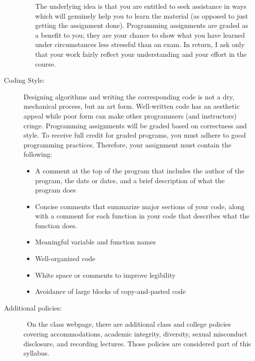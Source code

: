 \documentclass [letterpaper,11pt]{article}
\begin{document}
\begin{description}
\begin{itemize}
\begin{itemize}
                        \end{itemize}
        
        The underlying idea is that you are entitled to seek assistance in ways which will genuinely help you to learn the material (as opposed to just getting the assignment done).  Programming assignments are graded as a benefit to you;  they are your chance to show what you have learned under circumstances less stressful than an exam.  In return, I ask only that your work fairly reflect your understanding and your effort in the course.
        \end{itemize}


\item[Coding Style:]
Designing algorithms and writing the corresponding code is not a dry, mechanical process, but an art form.  Well-written code has an aesthetic appeal while poor form can make other programmers (and instructors) cringe. Programming assignments will be graded based on correctness and style. To receive full credit for graded programs, you must adhere to good programming practices. Therefore, your assignment must contain the following:
\begin{itemize}\setlength{\itemsep}{0em}\setlength{\parskip}{0pt}
	\item A comment at the top of the program that includes the author of the program,
	the date or dates, and a brief description of what the program does
	\item Concise comments that summarize major sections of your code, along with a comment
	for each function in your code that describes what the function does.
	\item Meaningful variable and function names
	\item Well-organized code
	\item White space or comments to improve legibility
	\item Avoidance of large blocks of copy-and-pasted code
\end{itemize}
     
\item[Additional policies:] \
On the class webpage, there are additional class and college policies covering accommodations, academic integrity, diversity, sexual misconduct disclosure,
and recording lectures.   Those policies are considered part of this syllabus.
   
   
\end{description}

   
\end{document}
